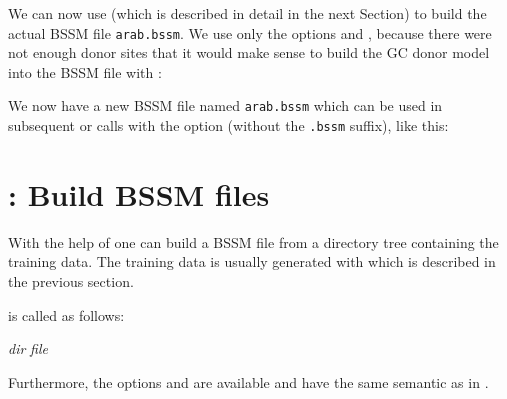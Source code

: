 \documentclass[11pt,a4paper,titlepage]{article}
\begin{document}
We can now use \Callgthbssmbuild (which is described in detail in the next
Section) to build the actual BSSM file \texttt{arab.bssm}.
We use only the options  and ,
because there were not enough donor sites that it would make sense
to build the GC donor model into the BSSM file with :

\begin{scriptsize}\end{scriptsize}

We now have a new BSSM file named \texttt{arab.bssm} which can be used in
subsequent \Callgth or \Callgthconsensus calls with the option 
(without the \texttt{.bssm} suffix), like this:

\begin{footnotesize}\end{footnotesize}


\section{\Callgthbssmbuild: Build BSSM files}
\label{gthbssmbuildsection}

With the help of \Callgthbssmbuild one can build a BSSM file from a directory
tree containing the training data. The training data is usually generated with
\Callgthbssmtrain which is described in the previous section.

\Callgthbssmbuild is called as follows:

\medskip
{}  \textit{dir}  \textit{file}
\medskip

\begin{Justshowoptions}
\end{Justshowoptions}

Furthermore, the options  and  are available 
and have the same semantic as in \Callgth.
\end{document}
